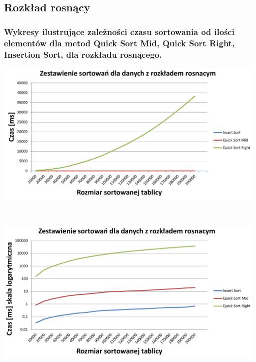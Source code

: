 \documentclass[polish,polish,a4paper]{article}
\begin{document}
\begin{spacing}{1.5}
\subsection{Rozkład rosnący}

\subsubsection*{Wykresy ilustrujące zależności czasu sortowania od ilości elementów dla metod Quick Sort Mid, Quick Sort Right, Insertion Sort, dla rozkładu rosnącego.}


	

\begin{minipage}[H]{\textwidth}
	\begin{center}
		\includegraphics[scale=0.6]{zad3rosnacynorm.pdf}
		\label{fig:zad3rosn}
	\end{center}
\end{minipage}\\[1cm]



\begin{minipage}[H]{\textwidth}
	\begin{center}
		\includegraphics[scale=0.6]{zad3rosnacylog.pdf}
		\label{fig:zad3roslog}
	\end{center}
\end{minipage}



\end{spacing}
\end{document}
